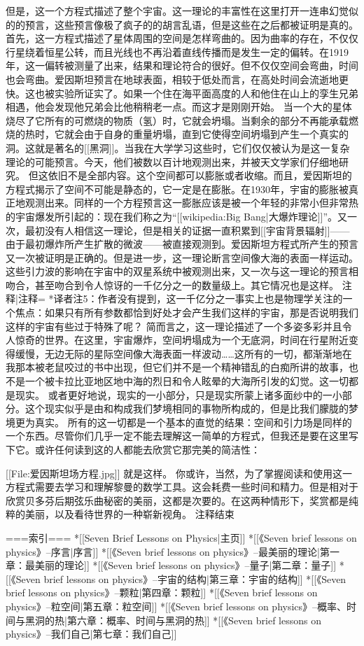 \documentclass[12pt,a4paper,twoside]{ctexrep}
\begin{document}
    但是，这一个方程式描述了整个宇宙。这一理论的丰富性在这里打开一连串幻觉似的的预言，这些预言像极了疯子的的胡言乱语，但是这些在之后都被证明是真的。
    首先，这一方程式描述了星体周围的空间是怎样弯曲的。因为曲率的存在，不仅仅行星绕着恒星公转，而且光线也不再沿着直线传播而是发生一定的偏转。在1919年，这一偏转被测量了出来，结果和理论符合的很好。但不仅仅空间会弯曲，时间也会弯曲。爱因斯坦预言在地球表面，相较于低处而言，在高处时间会流逝地更快。这也被实验所证实了。如果一个住在海平面高度的人和他住在山上的孪生兄弟相遇，他会发现他兄弟会比他稍稍老一点。而这才是刚刚开始。
    当一个大的星体烧尽了它所有的可燃烧的物质（氢）时，它就会坍塌。当剩余的部分不再能承载燃烧的热时，它就会由于自身的重量坍塌，直到它使得空间坍塌到产生一个真实的洞。这就是著名的[[黑洞]]。当我在大学学习这些时，它们仅仅被认为是这一复杂理论的可能预言。今天，他们被数以百计地观测出来，并被天文学家们仔细地研究。
    但这依旧不是全部内容。这个空间都可以膨胀或者收缩。而且，爱因斯坦的方程式揭示了空间不可能是静态的，它一定是在膨胀。在1930年，宇宙的膨胀被真正地观测出来。同样的一个方程预言这一膨胀应该是被一个年轻的非常小但非常热的宇宙爆发所引起的：现在我们称之为“[[wikipedia:Big Bang|大爆炸理论]]”。又一次，最初没有人相信这一理论，但是相关的证据一直积累到[[宇宙背景辐射]]——由于最初爆炸所产生扩散的微波——被直接观测到。爱因斯坦方程式所产生的预言又一次被证明是正确的。但是进一步，这一理论断言空间像大海的表面一样运动。这些引力波的影响在宇宙中的双星系统中被观测出来，又一次与这一理论的预言相吻合，甚至吻合到令人惊讶的一千亿分之一的数量级上。其它情况也是这样。
{{注释|注释=
*译者注5：作者没有提到，这一千亿分之一事实上也是物理学关注的一个焦点：如果只有所有参数都恰到好处才会产生我们这样的宇宙，那是否说明我们这样的宇宙有些过于特殊了呢？
}}
    简而言之，这一理论描述了一个多姿多彩并且令人惊奇的世界。在这里，宇宙爆炸，空间坍塌成为一个无底洞，时间在行星附近变得缓慢，无边无际的星际空间像大海表面一样波动……这所有的一切，都渐渐地在我那本被老鼠咬过的书中出现，但它们并不是一个精神错乱的白痴所讲的故事，也不是一个被卡拉比亚地区地中海的烈日和令人眩晕的大海所引发的幻觉。这一切都是现实。
    或者更好地说，现实的一小部分，只是现实所蒙上诸多面纱中的一小部分。这个现实似乎是由和构成我们梦境相同的事物所构成的，但是比我们朦胧的梦境更为真实。
    所有的这一切都是一个基本的直觉的结果：空间和引力场是同样的一个东西。尽管你们几乎一定不能去理解这一简单的方程式，但我还是要在这里写下它。或许任何读到这的人都能去欣赏它那完美的简洁性：
    
                            [[File:爱因斯坦场方程.jpg]]
    就是这样。
    你或许，当然，为了掌握阅读和使用这一方程式需要去学习和理解黎曼的数学工具。这会耗费一些时间和精力。但是相对于欣赏贝多芬后期弦乐曲秘密的美丽，这都是次要的。在这两种情形下，奖赏都是纯粹的美丽，以及看待世界的一种崭新视角。
{{注释结束}}


===索引===
*[[Seven Brief Lessons on Physics|主页]]
*[[《Seven brief lessons on physics》--序言|序言]]
*[[《Seven brief lessons on physics》--最美丽的理论|第一章：最美丽的理论]]
*[[《Seven brief lessons on physics》--量子|第二章：量子]]
*[[《Seven brief lessons on physics》--宇宙的结构|第三章：宇宙的结构]]
*[[《Seven brief lessons on physics》--颗粒|第四章：颗粒]]
*[[《Seven brief lessons on physics》--粒空间|第五章：粒空间]]
*[[《Seven brief lessons on physics》--概率、时间与黑洞的热|第六章：概率、时间与黑洞的热]]
*[[《Seven brief lessons on physics》--我们自己|第七章：我们自己]]
\end{document}
